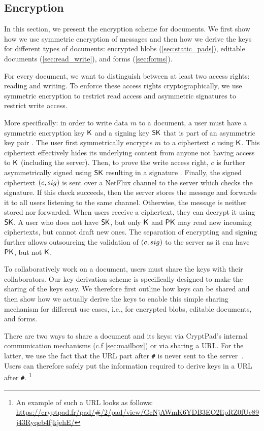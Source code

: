 \subsection{Encryption}
\label{sec:pad_encryption}

In this section, we present the encryption scheme for documents.
We first show how we use symmetric encryption of messages and then how we derive the keys for different types of documents:
encrypted blobs (\cref{sec:static_pads}), editable documents (\cref{sec:read_write}), and forms (\cref{sec:forms}).

For every document, we want to distinguish between at least two access rights: reading and writing.
To enforce these access rights cryptographically, we use symmetric encryption to restrict read access and asymmetric signatures to restrict write access.

More specifically: in order to write data $m$ to a document, a user must have a symmetric encryption key $\mySymKey$ and a signing key $\mySK$ that is part of an asymmetric key pair \myKeyPair{}.
The user first symmetrically encrypts $m$ to a ciphertext $c$ using $\mySymKey$.
This ciphertext effectively hides its underlying content from anyone not having access to $\mySymKey$ (including the server).
Then, to prove the write access right, $c$ is further asymmetrically signed using $\mySK$ resulting in a signature \mySig.
Finally, the signed ciphertext $(c,sig)$ is sent over a NetFlux channel to the server which checks the signature.
If this check succeeds, then the server stores the message and forwards it to all users listening to the same channel.
Otherwise, the message is neither stored nor forwarded.
When users receive a ciphertext, they can decrypt it using $\mySK$.
A user who does not have $\mySK$, but only $\mySymKey$ and $\myPK$ may read new incoming ciphertexts, but cannot draft new ones.
The separation of encrypting and signing further allows outsourcing the validation of $(c, sig)$ to the server as it can have $\myPK$, but not $\mySymKey$.

To collaboratively work on a document, users must share the keys with their collaborators.
Our key derivation scheme is specifically designed to make the sharing of the keys easy.
We therefore first outline how keys can be shared and then show how we actually derive the keys to enable this simple sharing mechanism for different use cases, i.e., for encrypted blobs, editable documents, and forms.

There are two ways to share a document and its keys: via CryptPad's internal communication mechanisms (c.f \cref{sec:mailbox}) or via sharing a URL.
For the latter, we use the fact that the URL part after \texttt{\#} is never sent to the server~\cite{BernersLee2005}.
Users can therefore safely put the information required to derive keys in a URL after \texttt{\#}.%
\footnote{An example of such a URL looks as follows: \url{https://cryptpad.fr/pad/\#/2/pad/view/GcNjAWmK6YDB3EO2IipRZ0fUe89j43Ryqeb4fjkjehE/}}

